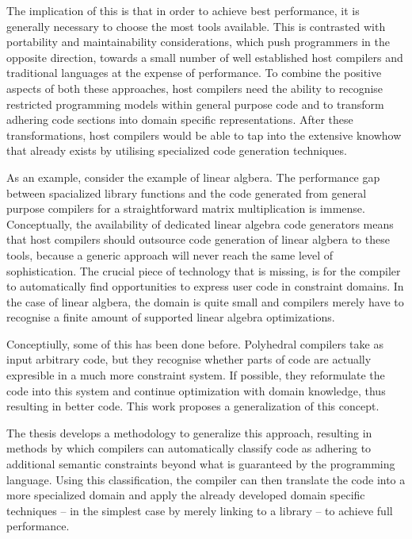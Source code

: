     The implication of this is that in order to achieve best performance, it is
    generally necessary to choose the most tools available.
    This is contrasted with portability and maintainability considerations,
    which push programmers in the opposite direction, towards a small number of
    well established host compilers and traditional languages at the expense of
    performance.
    To combine the positive aspects of both these approaches, host compilers
    need the ability to recognise restricted programming models within general
    purpose code and to transform adhering code sections into domain specific
    representations.
    After these transformations, host compilers would be able to tap into the
    extensive knowhow that already exists by utilising specialized code
    generation techniques.

    As an example, consider the example of linear algbera.
    The performance gap between spacialized library functions and the code
    generated from general purpose compilers for a straightforward matrix
    multiplication is immense.
    Conceptually, the availability of dedicated linear algebra code generators
    means that host compilers should outsource code generation of linear algbera
    to these tools, because a generic approach will never reach the same level
    of sophistication.
    The crucial piece of technology that is missing, is for the compiler to
    automatically find opportunities to express user code in constraint
    domains.
    In the case of linear algbera, the domain is quite small and compilers
    merely have to recognise a finite amount of supported linear algebra
    optimizations.

    Conceptiully, some of this has been done before.
    Polyhedral compilers take as input arbitrary code, but they recognise whether
    parts of code are actually expresible in a much more constraint system.
    If possible, they reformulate the code into this system and continue
    optimization with domain knowledge, thus resulting in better code.
    This work proposes a generalization of this concept.

    The thesis develops a methodology to generalize this approach, resulting in
    methods by which compilers can automatically classify code as adhering to
    additional semantic constraints beyond what is guaranteed by the programming
    language.
    Using this classification, the compiler can then translate the code into a
    more specialized domain and apply the already developed domain specific
    techniques -- in the simplest case by merely linking to a library -- to
    achieve full performance.

